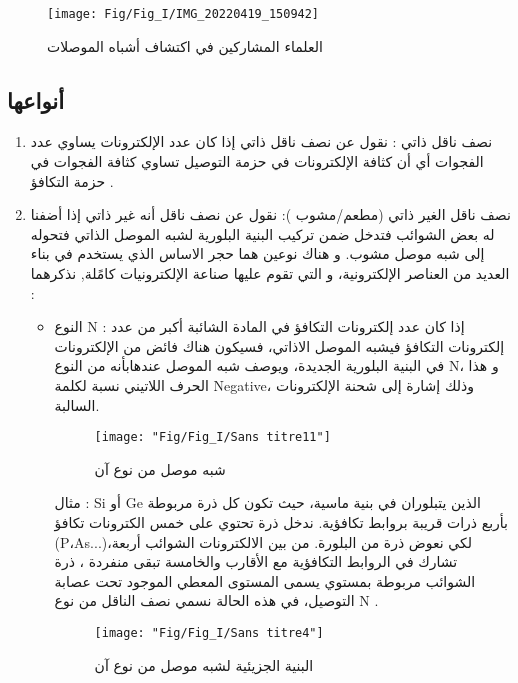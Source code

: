 \begin{figure}[bh]
	\centering
	\texttt{[image: Fig/Fig\_I/IMG\_20220419\_150942]}
	\caption{العلماء المشاركين في اكتشاف أشباه الموصلات}
	\label{fig:img20220419150942}
\end{figure}

\subsection{ أنواعها}

\begin{enumerate}
	\item 
	نصف ناقل ذاتي : نقول عن نصف ناقل ذاتي إذا كان عدد الإلكترونات يساوي عدد الفجوات أي أن كثافة الإلكترونات في 
	حزمة التوصيل تساوي كثافة الفجوات في حزمة التكافؤ .
	\item 
	نصف ناقل الغير ذاتي (مطعم/مشوب ): نقول عن نصف ناقل أنه غير ذاتي إذا أضفنا له بعض الشوائب فتدخل ضمن تركيب البنية البلورية لشبه الموصل الذاتي فتحوله إلى شبه موصل مشوب. 
	و هناك نوعين هما حجر الاساس الذي يستخدم في بناء العديد من العناصر الإلكترونية، و التي تقوم عليها صناعة الإلكترونيات كامًلة, نذكرهما :
	\begin{itemize}
		\item 
		النوع N : إذا كان عدد إلكترونات التكافؤ في المادة الشائبة أكبر من عدد إلكترونات التكافؤ فيشبه الموصل الاذاتي، فسيكون هناك فائض من الإلكترونات في البنية البلورية الجديدة، ويوصف شبه الموصل عندهابأنه من النوع N، و هذا الحرف اللاتيني نسبة لكلمة Negative، وذلك إشارة إلى شحنة الإلكترونات السالبة.
		
		\begin{figure}[h]
			\centering
			\texttt{[image: "Fig/Fig\_I/Sans titre11"]}
			\caption{شبه موصل من نوع آن}
			\label{fig:sans-titre11}
		\end{figure}
		
		مثال : Si أو Ge الذين يتبلوران في بنية ماسية، حيث تكون كل ذرة مربوطة بأربع ذرات قريبة بروابط تكافؤية. ندخل ذرة تحتوي على خمس الكترونات تكافؤ (P،As...)،لكي نعوض ذرة من البلورة. من بين الالكترونات الشوائب أربعة تشارك في الروابط التكافؤية مع الأقارب والخامسة تبقى منفردة ، ذرة الشوائب مربوطة بمستوي يسمى المستوى المعطي الموجود تحت عصابة التوصيل، في هذه الحالة نسمي نصف الناقل من نوع N .
		
		\begin{figure}[h]
			\centering
			\texttt{[image: "Fig/Fig\_I/Sans titre4"]}
			\caption{البنية الجزيئية لشبه موصل من نوع آن}
			\label{fig:sans-titre4}
		\end{figure}
		

\end{itemize}
\end{enumerate}
